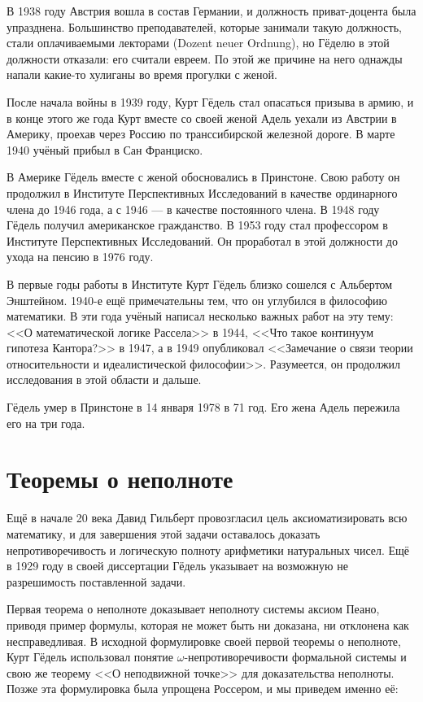 \documentclass[specialist,
               substylefile = spbu.rtx,
               subf,href,colorlinks=true, 12pt]{disser}
\begin{document}
В 1938 году Австрия вошла в состав Германии, и должность приват-доцента была упразднена. Большинство преподавателей, которые занимали такую должность, стали оплачиваемыми лекторами (Dozent neuer Ordnung), но Гёделю в этой должности отказали: его считали евреем. По этой же причине на него однажды напали какие-то хулиганы во время прогулки с женой.\par

После начала войны в 1939 году, Курт Гёдель стал опасаться призыва в армию, и в конце этого же года Курт вместе со своей женой Адель уехали из Австрии в Америку, проехав через Россию по транссибирской железной дороге. В марте 1940 учёный прибыл в Сан Франциско.\par

В Америке Гёдель вместе с женой обосновались в Принстоне. Свою работу он продолжил в Институте Перспективных Исследований в качестве ординарного члена до 1946 года, а с 1946 --- в качестве постоянного члена. В 1948 году Гёдель получил американское гражданство. В 1953 году стал профессором в Институте Перспективных Исследований. Он проработал в этой должности до ухода на пенсию в 1976 году.\par

В первые годы работы в Институте Курт Гёдель близко сошелся с Альбертом Энштейном. 1940-е ещё примечательны тем, что он углубился в философию математики. В эти года учёный написал несколько важных работ на эту тему: <<О математической логике Рассела>> в 1944, <<Что такое континуум гипотеза Кантора?>> в 1947, а в 1949 опубликовал <<Замечание о связи теории относительности и идеалистической философии>>. Разумеется, он продолжил исследования в этой области и дальше. 

Гёдель умер в Принстоне в 14 января 1978 в 71 год. Его жена Адель пережила его на три года.

\chapter{Теоремы о неполноте}

Ещё в начале 20 века Давид Гильберт провозгласил цель аксиоматизировать всю математику, и для завершения этой задачи оставалось доказать непротиворечивость и логическую полноту арифметики натуральных чисел. Ещё в 1929 году в своей диссертации Гёдель указывает на возможную не разрешимость поставленной задачи.\par

Первая теорема о неполноте доказывает неполноту системы аксиом Пеано, приводя пример формулы, которая не может быть ни доказана, ни отклонена как несправедливая. В исходной формулировке своей первой теоремы о неполноте, Курт Гёдель использовал понятие $\omega$-непротиворечивости формальной системы и свою же теорему <<О неподвижной точке>> для доказательства неполноты. Позже эта формулировка была упрощена Россером, и мы приведем именно её:
\end{document}
